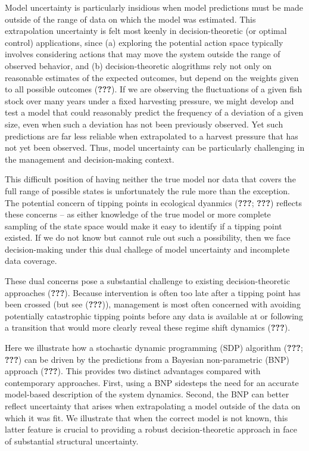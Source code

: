 \documentclass[author-year, review]{elsarticle} %
\begin{document}
Model uncertainty is particularly insidious when model predictions must
be made outside of the range of data on which the model was estimated.
This extrapolation uncertainty is felt most keenly in decision-theoretic
(or optimal control) applications, since (a) exploring the potential
action space typically involves considering actions that may move the
system outside the range of observed behavior, and (b)
decision-theoretic alogrithms rely not only on reasonable estimates of
the expected outcomes, but depend on the weights given to all possible
outcomes ({\textbf{???}}). If we are observing the fluctuations of a
given fish stock over many years under a fixed harvesting pressure, we
might develop and test a model that could reasonably predict the
frequency of a deviation of a given size, even when such a deviation has
not been previously observed. Yet such predictions are far less reliable
when extrapolated to a harvest pressure that has not yet been observed.
Thus, model uncertainty can be particularly challenging in the
management and decision-making context.

This difficult position of having neither the true model nor data that
covers the full range of possible states is unfortunately the rule more
than the exception. The potential concern of tipping points in
ecological dyanmics ({\textbf{???}}; {\textbf{???}}) reflects these
concerns -- as either knowledge of the true model or more complete
sampling of the state space would make it easy to identify if a tipping
point existed. If we do not know but cannot rule out such a possibility,
then we face decision-making under this dual challege of model
uncertainty and incomplete data coverage.

These dual concerns pose a substantial challenge to existing
decision-theoretic approaches ({\textbf{???}}). Because intervention is
often too late after a tipping point has been crossed (but see
({\textbf{???}})), management is most often concerned with avoiding
potentially catastrophic tipping points before any data is available at
or following a transition that would more clearly reveal these regime
shift dynamics ({\textbf{???}}).

Here we illustrate how a stochastic dynamic programming (SDP) algorithm
({\textbf{???}}; {\textbf{???}}) can be driven by the predictions from a
Bayesian non-parametric (BNP) approach ({\textbf{???}}). This provides
two distinct advantages compared with contemporary approaches. First,
using a BNP sidesteps the need for an accurate model-based description
of the system dynamics. Second, the BNP can better reflect uncertainty
that arises when extrapolating a model outside of the data on which it
was fit. We illustrate that when the correct model is not known, this
latter feature is crucial to providing a robust decision-theoretic
approach in face of substantial structural uncertainty.
\end{document}
